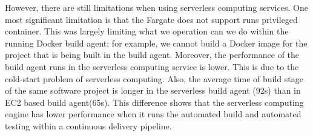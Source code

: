 \par
However, there are still limitations when using serverless computing services. One most significant limitation is that the Fargate does not support runs privileged container. This was largely limiting what we operation can we do within the running Docker build agent; for example, we cannot build a Docker image for the project that is being built in the build agent. Moreover, the performance of the build agent runs in the serverless computing service is lower. This is due to the cold-start problem of serverless computing. Also, the average time of build stage of the same software project is longer in the serverless build agent (92s) than in EC2 based build agent(65s). This difference shows that the serverless computing engine has lower performance when it runs the automated build and automated testing within a continuous delivery pipeline.
